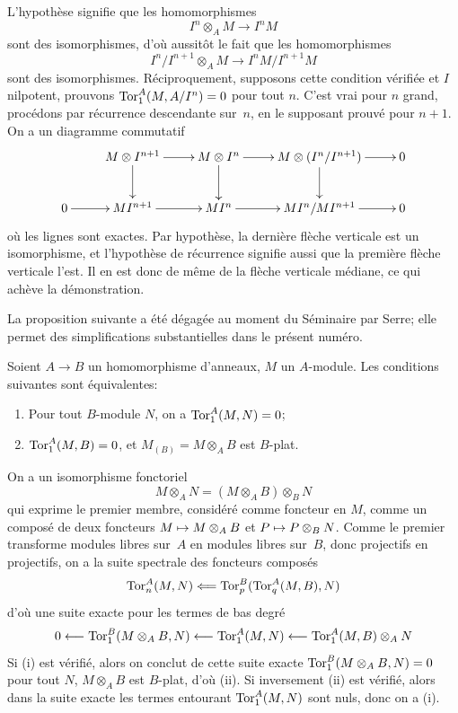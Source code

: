 L'hypoth\`ese signifie que les homomorphismes
$$
I^n \otimes_A M \to I^n M
$$
sont des isomorphismes, d'o\`u aussit\^ot le fait que les
homomorphismes
$$
I^n / I^{n+1} \otimes_A M \to I^n M / I^{n+1} M
$$
sont des isomorphismes. R\'eciproquement, supposons cette condition
v\'erifi\'ee et $I$ nilpotent, prouvons $\operatorname{Tor}_1^A(M,A/I^n) =0$
pour tout $n$. C'est vrai pour $n$ grand, proc\'edons par
r\'ecurrence descendante sur~$n$, en le supposant prouv\'e pour
$n+1$. On a un diagramme commutatif
$$
\xymatrix{ &{M \otimes I^{n+1}}\ar[r]\ar[d]&{M \otimes I^n}\ar[r]\ar[d]&{M \otimes(I^n/I^{n+1})}\ar[r]\ar[d]&{0}\\{0}\ar[r]&{MI^{n+1}}\ar[r]&{MI^n}\ar[r]&{MI^n/MI^{n+1}}\ar[r]&{0}}
$$
o\`u
les lignes sont exactes. Par hypoth\`ese, la derni\`ere fl\`eche
verticale est un isomorphisme, et l'hypoth\`ese de r\'ecurrence
signifie aussi que la premi\`ere fl\`eche verticale l'est. Il en
est donc de m\^eme de la fl\`eche verticale m\'ediane, ce qui
ach\`eve la d\'emonstration.

La proposition suivante a \'et\'e d\'egag\'ee au moment du
S\'eminaire par Serre; elle permet des simplifications
substantielles dans le pr\'esent num\'ero.
\begin{proposition}
\label{IV.5.2}
Soient $A \to B$ un homomorphisme d'anneaux, $M$ un $A$-module. Les
conditions suivantes sont \'equivalentes:
\begin{enumerate}
\item[(i)] Pour tout $B$-module $N$, on a $\operatorname{Tor}_1^A(M,N) = 0$;
\item[(ii)] $\operatorname{Tor}_1^A(M,B) = 0$, et $M_{(B)} = M \otimes_A B$ est
$B$-plat.
\end{enumerate}
\end{proposition}

On a un isomorphisme fonctoriel
$$
M \otimes_A N = (M \otimes_A B) \otimes_B N
$$
qui exprime le premier membre, consid\'er\'e comme foncteur en
$M$, comme un compos\'e de deux foncteurs $M \mto M \otimes_A B$
et $P \mto P \otimes_B N$. Comme le premier transforme modules
libres sur~$A$ en modules libres sur~$B$, donc projectifs en
projectifs, on a la suite spectrale des foncteurs compos\'es
$$
\Tor_n^A(M,N) \From \Tor_p^B(\Tor_q^A(M,B),N)
$$
d'o\`u une suite exacte pour les termes de bas degr\'e
$$
0 \from \Tor_1^B(M \otimes_A B,N) \from \Tor_1^A(M,N)
\from \Tor_1^A(M,B) \otimes_A N
$$
Si (i) est v\'erifi\'e, alors on conclut de cette suite exacte
$\operatorname{Tor}_1^B(M \otimes_A B,N) = 0$ pour tout $N$, \ie $M \otimes_A B$
est $B$-plat, d'o\`u (ii). Si inversement (ii) est v\'erifi\'e,
alors dans la suite exacte les termes entourant $\operatorname{Tor}_1^A(M,N)$ sont
nuls, donc on a (i).

